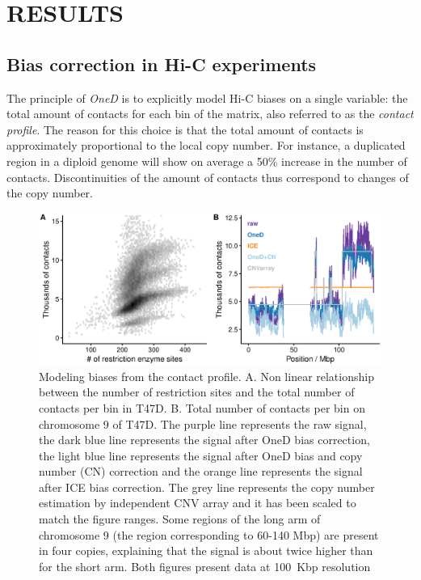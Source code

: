 \documentclass[a4,center,fleqn]{NAR}
\providecommand{\DIFadd}[1]{{\protect\color{red}#1}} %
\providecommand{\DIFdel}[1]{{\protect}}                      %
\providecommand{\DIFaddFL}[1]{\DIFadd{#1}} %
\providecommand{\DIFdelFL}[1]{\DIFdel{#1}} %
\providecommand{\DIFaddbeginFL}{} %
\providecommand{\DIFaddendFL}{} %
\providecommand{\DIFdelbeginFL}{} %
\providecommand{\DIFdelendFL}{} %
\begin{document}
\section{RESULTS}

\subsection{Bias correction in Hi-C experiments}

The principle of \textit{OneD} is to explicitly model Hi-C biases on a
single variable: the total amount of contacts for each bin of the matrix,
also referred to as the \textit{contact profile}. The reason for this
choice is that the total amount of contacts is approximately proportional
to the local copy number. For instance, a duplicated region in a diploid
genome will show on average a 50\% increase in the number of contacts.
Discontinuities of the amount of contacts thus correspond to changes of
the copy number.

\begin{figure}
\centerline{\includegraphics[width=.49\textwidth]{figure_1.eps}}
\caption{Modeling biases from the contact profile. A. Non linear
relationship between the number of restriction sites and the total number
of contacts per bin in T47D. B. Total number of contacts per bin on
chromosome \DIFdelbeginFL \DIFdelFL{17 }\DIFdelendFL \DIFaddbeginFL \DIFaddFL{9 }\DIFaddendFL of T47D. The purple line represents the raw signal, the dark blue
line represents the signal after OneD bias correction, the light blue line
represents the signal after OneD bias and copy number (CN) correction and
the orange line represents the signal after ICE bias correction. The \DIFaddbeginFL \DIFaddFL{grey
line represents the copy number estimation by independent CNV array and it
has been scaled to match the figure ranges. Some regions of the }\DIFaddendFL long arm of
chromosome \DIFdelbeginFL \DIFdelFL{17 }\DIFdelendFL \DIFaddbeginFL \DIFaddFL{9 }\DIFaddendFL (the region corresponding to \DIFdelbeginFL \DIFdelFL{20-80 }\DIFdelendFL \DIFaddbeginFL \DIFaddFL{60-140 }\DIFaddendFL Mbp) \DIFdelbeginFL \DIFdelFL{is }\DIFdelendFL \DIFaddbeginFL \DIFaddFL{are }\DIFaddendFL present in four
copies, explaining that the signal is about twice higher than for the short
arm. \DIFaddbeginFL \DIFaddFL{Both figures present data at 100~Kbp resolution}\DIFaddendFL }
\label{fig:totals}
\end{figure}
\end{document}
